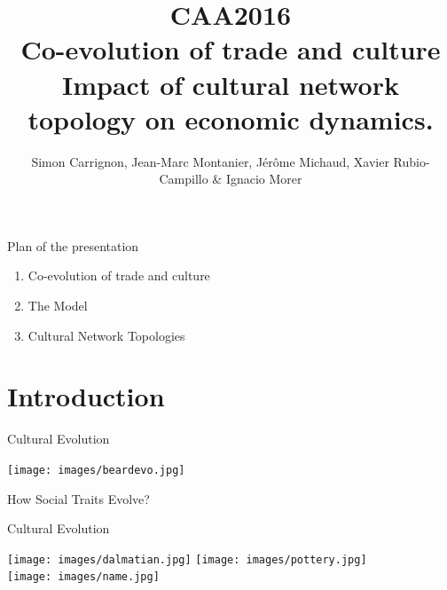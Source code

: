 \documentclass[12pt, notes=show]{beamer}
\title{
	CAA2016\\
	Co-evolution of trade and culture\\
	Impact of cultural network topology on economic dynamics.
}
\institute{3 May 2016}
\author{Simon Carrignon, Jean-Marc Montanier, Jérôme Michaud, Xavier Rubio-Campillo \& Ignacio Morer }
\date{
	\scriptsize
	\begin{columns}
		\begin{column}{.3\textwidth}
			\begin{center}
				Barcelona Supercomputing Center	\\
				\texttt{[image: images/bscLogo.jpg]} \hspace{2cm}
			\end{center}
		\end{column}
		\begin{column}{.3\textwidth}
			\begin{center}
				Univ. Pompeu Fabra Complex System Lab.\\
				\texttt{[image: images/upfLogo.jpeg]} %
			\end{center}
		\end{column}
	\end{columns}

}
\begin{document}
\begin{frame}
	\maketitle

\end{frame}

\begin{frame}{Plan of the presentation}
	\begin{enumerate}
		\item Co-evolution of trade and culture
			\vfill
		\item The Model
			\vfill
		\item Cultural Network Topologies
			\vfill
	\end{enumerate}

\end{frame}

\section{Introduction}
\begin{frame}{Cultural Evolution}
	\begin{center}
		\texttt{[image: images/beardevo.jpg]} 
	\end{center}
	How Social Traits Evolve?
\end{frame}

\begin{frame}{Cultural Evolution}
	\begin{center}
		\texttt{[image: images/dalmatian.jpg]} \hspace{2cm}
		\texttt{[image: images/pottery.jpg]}\\
		\vspace{1cm}
		\texttt{[image: images/name.jpg]}
	\end{center}
\end{frame}
\end{document}
